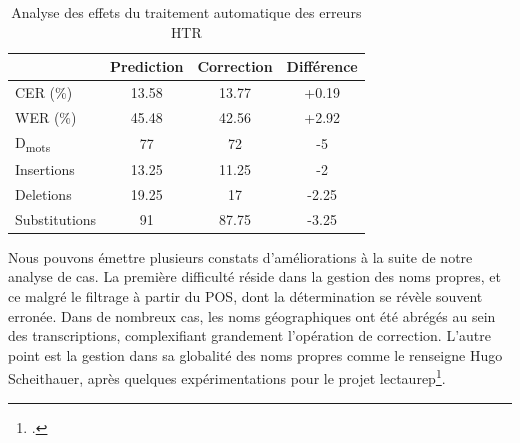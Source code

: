 	\begin{table}[h]
	\centering
    \begin{tabular}{l|cc|c|}
    \cline{2-4}
                                        & \multicolumn{1}{l|}{\textbf{Prediction}} & \multicolumn{1}{l|}{\textbf{Correction}} & \multicolumn{1}{l|}{\textbf{Différence}} \\ \hline
    \multicolumn{1}{|l|}{CER (\%)}           & 13.58                                    & 13.77                                    & +0.19                                    \\ \cline{1-1} \hline
    \multicolumn{1}{|l|}{WER (\%)}           & 45.48                                    & 42.56                                    & +2.92                                    \\ \cline{1-1} \hline
    \multicolumn{1}{|l|}{D\textsubscript{mots}}   & 77                                       & 72                                       & -5                                       \\ \cline{1-1} \hline
    \multicolumn{1}{|l|}{Insertions}    & 13.25                                    & 11.25                                    & -2                                       \\ \cline{1-1} \hline
    \multicolumn{1}{|l|}{Deletions}     & 19.25                                    & 17                                       & -2.25                                    \\ \cline{1-1} \hline
    \multicolumn{1}{|l|}{Substitutions} & 91                                       & 87.75                                    & -3.25                                    \\ \cline{1-1} \hline
    \end{tabular}
    \caption{Analyse des effets du traitement automatique des erreurs HTR}
    \label{tab:erreurs_compa}
    \end{table}
    
    Nous pouvons émettre plusieurs constats d'améliorations à la suite de notre analyse de cas. La première difficulté réside dans la gestion des noms propres, et ce malgré le filtrage à partir du POS, dont la détermination se révèle souvent erronée. Dans de nombreux cas, les noms géographiques ont été abrégés au sein des transcriptions, complexifiant grandement l'opération de correction. L'autre point est la gestion dans sa globalité des noms propres comme le renseigne Hugo Scheithauer, après quelques expérimentations pour le projet \gls{lectaurep}\footcite[p.~88-89]{scheithauerReconnaissanceEntitesNommees2021}.
	
